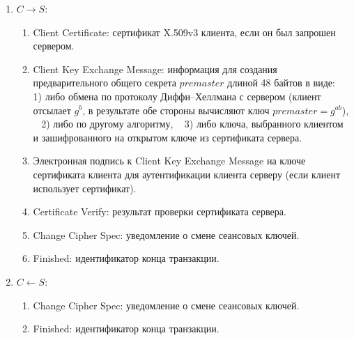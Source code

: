 \begin{enumerate}
    \item $C \rightarrow S$:
        \begin{enumerate}
            \item Client Certificate: сертификат X.509v3 клиента, если он был запрошен сервером.
            \item Client Key Exchange Message: информация для создания предварительного общего секрета $premaster$ длиной 48 байтов в виде: ~ 1) либо обмена по протоколу Диффи--Хеллмана с сервером (клиент отсылает $g^b$, в результате обе стороны вычисляют ключ $premaster = g^{ab}$), ~ 2) либо по другому алгоритму, ~ 3) либо ключа, выбранного клиентом и зашифрованного на открытом ключе из сертификата сервера.
            \item Электронная подпись к Client Key Exchange Message на ключе сертификата клиента для аутентификации клиента серверу (если клиент использует сертификат).
            \item Certificate Verify: результат проверки сертификата сервера.
            \item Change Cipher Spec: уведомление о смене сеансовых ключей.
            \item Finished: идентификатор конца транзакции.
        \end{enumerate}

    \item $C \leftarrow S$:
        \begin{enumerate}
            \item Change Cipher Spec: уведомление о смене сеансовых ключей.
            \item Finished: идентификатор конца транзакции.
        \end{enumerate}
\end{enumerate}




